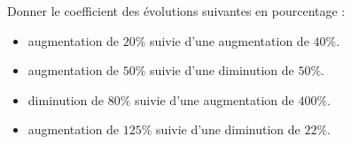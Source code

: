 \documentclass{automatisme}
\begin{document}
\begin{frame}
	Donner le coefficient des évolutions suivantes en pourcentage :

	\begin{itemize}
		\item augmentation de $20\%$ suivie d'une augmentation de $40\%$. 
		\item augmentation de $50\%$ suivie d'une diminution de $50\%$. 
		\item diminution de $80\%$ suivie d'une augmentation de $400\%$. 
		\item augmentation de $125\%$ suivie d'une diminution de $22\%$. 
	\end{itemize}
\end{frame}
\end{document}
